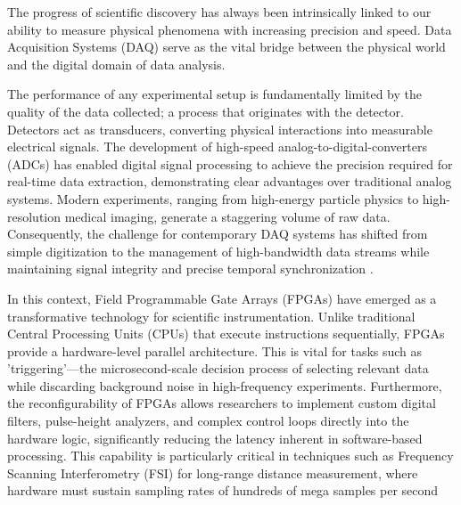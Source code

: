 
The progress of scientific discovery has always been intrinsically linked to our ability to measure physical phenomena with increasing precision and speed. Data Acquisition Systems (DAQ) serve as the vital bridge between the physical world and the digital domain of data analysis.

The performance of any experimental setup is fundamentally limited by the quality of the data collected; a process that originates with the detector. Detectors act as transducers, converting physical interactions into measurable electrical signals. The development of high-speed analog-to-digital-converters (ADCs) has enabled digital signal processing to achieve the precision required for real-time data extraction, demonstrating clear advantages over traditional analog systems. Modern experiments, ranging from high-energy particle physics to high-resolution medical imaging, generate a staggering volume of raw data. Consequently, the challenge for contemporary DAQ systems has shifted from simple digitization to the management of high-bandwidth data streams while maintaining signal integrity and precise temporal synchronization \cite[pp. 668--669]{knollRadiationDetectionMeasurement2010}.

In this context, Field Programmable Gate Arrays (FPGAs) have emerged as a transformative technology for scientific instrumentation. Unlike traditional Central Processing Units (CPUs) that execute instructions sequentially, FPGAs provide a hardware-level parallel architecture. This is vital for tasks such as 'triggering'—the microsecond-scale decision process of selecting relevant data while discarding background noise in high-frequency experiments. Furthermore, the reconfigurability of FPGAs allows researchers to implement custom digital filters, pulse-height analyzers, and complex control loops directly into the hardware logic, significantly reducing the latency inherent in software-based processing. This capability is particularly critical in techniques such as Frequency Scanning Interferometry (FSI) for long-range distance measurement, where hardware must sustain sampling rates of hundreds of mega samples per second \cite{sivanathanDesignFPGABasedHighSpeed2024}

